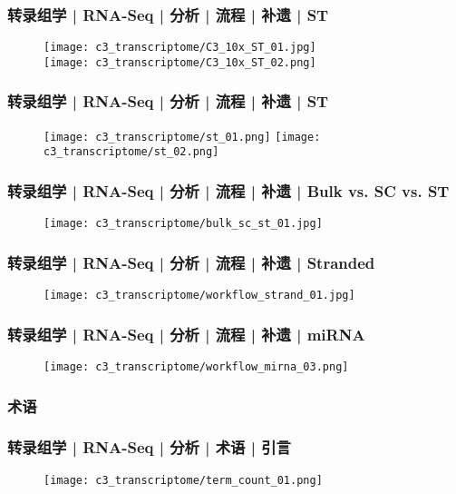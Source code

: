 \begin{frame}
  \frametitle{转录组学 | RNA-Seq | 分析 | 流程 | 补遗 | ST}
  \begin{figure}
    \centering
    \texttt{[image: c3\_transcriptome/C3\_10x\_ST\_01.jpg]}\\
    \vspace{1em}
    \texttt{[image: c3\_transcriptome/C3\_10x\_ST\_02.png]}
  \end{figure}
\end{frame}

\begin{frame}
  \frametitle{转录组学 | RNA-Seq | 分析 | 流程 | 补遗 | ST}
  \begin{figure}
    \centering
    \texttt{[image: c3\_transcriptome/st\_01.png]}
    \texttt{[image: c3\_transcriptome/st\_02.png]}
  \end{figure}
\end{frame}

\begin{frame}
  \frametitle{转录组学 | RNA-Seq | 分析 | 流程 | 补遗 | Bulk vs. SC vs. ST}
  \begin{figure}
    \centering
    \texttt{[image: c3\_transcriptome/bulk\_sc\_st\_01.jpg]}
  \end{figure}
\end{frame}

\begin{frame}
  \frametitle{转录组学 | RNA-Seq | 分析 | 流程 | 补遗 | Stranded}
  \begin{figure}
    \centering
    \texttt{[image: c3\_transcriptome/workflow\_strand\_01.jpg]}
  \end{figure}
\end{frame}

\begin{frame}
  \frametitle{转录组学 | RNA-Seq | 分析 | 流程 | 补遗 | miRNA}
  \begin{figure}
    \centering
    \texttt{[image: c3\_transcriptome/workflow\_mirna\_03.png]}
  \end{figure}
\end{frame}

\subsubsection{术语}
\begin{frame}
  \frametitle{转录组学 | RNA-Seq | 分析 | 术语 | 引言}
  \begin{figure}
    \centering
    \texttt{[image: c3\_transcriptome/term\_count\_01.png]}
  \end{figure}
\end{frame}

